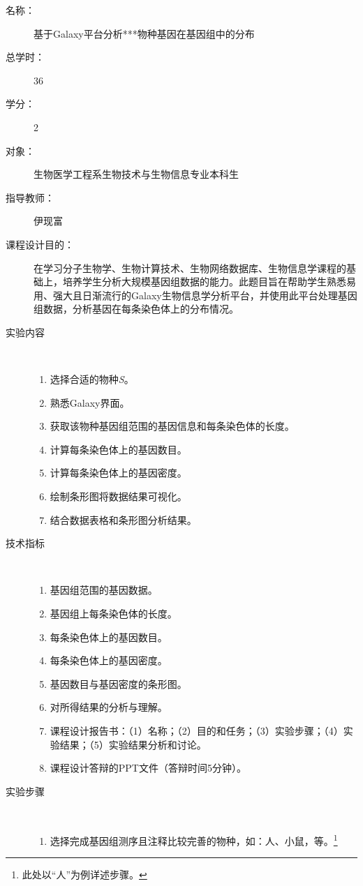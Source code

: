 \newpage
\begin{description}
	\item[名称：] 基于Galaxy平台分析***物种基因在基因组中的分布 
	\item[总学时：] 36
	\item[学分：] 2
	\item[对象：] 生物医学工程系生物技术与生物信息专业本科生
	\item[指导教师：] 伊现富
	\item[课程设计目的：] 在学习分子生物学、生物计算技术、生物网络数据库、生物信息学课程的基础上，培养学生分析大规模基因组数据的能力。此题目旨在帮助学生熟悉易用、强大且日渐流行的Galaxy生物信息学分析平台，并使用此平台处理基因组数据，分析基因在每条染色体上的分布情况。
	\item[实验内容] \
		\begin{enumerate}
			\item 选择合适的物种\textit{S}。
			\item 熟悉Galaxy界面。
			\item 获取该物种基因组范围的基因信息和每条染色体的长度。
			\item 计算每条染色体上的基因数目。
			\item 计算每条染色体上的基因密度。
			\item 绘制条形图将数据结果可视化。
			\item 结合数据表格和条形图分析结果。
		\end{enumerate}
	\item[技术指标] \
		\begin{enumerate}
			\item 基因组范围的基因数据。
			\item 基因组上每条染色体的长度。
			\item 每条染色体上的基因数目。
			\item 每条染色体上的基因密度。
			\item 基因数目与基因密度的条形图。
			\item 对所得结果的分析与理解。
			\item 课程设计报告书：（1）名称；（2）目的和任务；（3）实验步骤；（4）实验结果；（5）实验结果分析和讨论。
			\item 课程设计答辩的PPT文件（答辩时间5分钟）。
		\end{enumerate}
	\item[实验步骤] \ 
		\begin{enumerate}
			\item 选择完成基因组测序且注释比较完善的物种，如：人、小鼠，等。\footnote{此处以“人”为例详述步骤。}

\end{enumerate}
\end{description}
